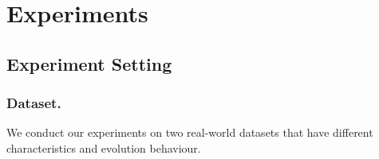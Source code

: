 \section{Experiments}


\subsection{Experiment Setting}

\subsubsection{Dataset.} We conduct our experiments on two real-world datasets that have different characteristics and evolution behaviour. 


